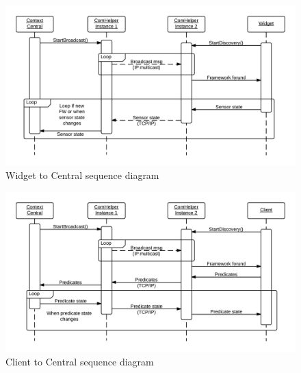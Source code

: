 \documentclass[../report.tex]{subfiles}
\begin{document}
\begin{figure}
\centering
\includegraphics[width=\linewidth]{comHelperSequence-widget.png}
\caption{Widget to Central sequence diagram}
\label{fig:widgetComHelper}
\end{figure}

\begin{figure}
\centering
\includegraphics[width=\linewidth]{comHelperSequence-client.png}
\caption{Client to Central sequence diagram}
\label{fig:clientComHelper}
\end{figure}
\end{document}
